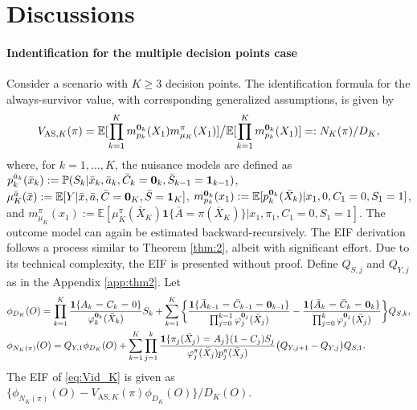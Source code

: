 \documentclass{article}
\newcommand{\pk}{{\varphi}}
\newcommand{\pr}{\mathbb{P}}
\newcommand{\E}{\mathbb{E}}
\newcommand{\tred}{{}}   %
\begin{document}
%
%
\section{Discussions}

\paragraph{Indentification for the multiple decision points case}
Consider a scenario with $K \ge 3$ decision points. The identification formula for the always-survivor value, with corresponding generalized assumptions, is given by
	\begin{gather}
	V_{\text{AS},K}(\pi) = 
	  {\E[ \prod_{k=1}^K m_{p_k}^{{\bf0}_k}(X_1) m_{\mu_K}^\pi(X_1) ]} \big /
	    {\E[ \prod_{k=1}^K m_{p_k}^{{\bf0}_k}(X_1) ]}
	    =: {N_K(\pi)}/{D_K},  \label{eq:Vid_K}
	\end{gather}
	where, for $k = 1, \dots, K$, the nuisance models are defined as
	$p_k^{\bar a_k}(\bar x_k) := \pr(S_k | \bar x_k, \bar a_k, \bar C_k={\bf0}_k, \bar S_{k-1}={\bf1}_{k-1})$,
	$\mu_K^{\bar a}(\bar x) := \E[Y | \bar x, \bar a, \bar C={\bf0}_K, \bar S={\bf1}_K]$,
	$m_{p_k}^{{\bf0}_k}(x_1) := \E[ p_k^{{\bf0}_k}(\bar X_k) | x_1, 0, C_1=0, S_1=1 ]$, and
	$m_{\mu_K}^{\pi}(x_1) := \E[ \mu_K^{\pi}(\bar X_K) \mathbf{1}\{\bar A=\pi(\bar X_K)\} %
	| x_1, \pi_1, C_1=0, S_1=1 ]$.
The outcome model can again be estimated backward-recursively.
The EIF derivation follows a process similar to Theorem \ref{thm:2}, albeit with significant effort. 
\tred{
Due to its technical complexity, the EIF is presented without proof. Define $Q_{S,j}$ and $Q_{Y,j}$ as in the Appendix \ref{app:thm2}. Let
\begin{align*}
	&\phi_{D_K}(O)
	 = \prod_{k=1}^K\frac{\mathbf{1}\{A_k\textrm{ = }C_k\textrm{ = }0\}}{\pk_k^{{\bf 0}_k}(\bar X_k)} S_k 
	 + \sum_{k=1}^K 
	   \bigg\{ \frac{\mathbf{1}\{\bar A_{k\emph{--}1}\textrm{ = }\bar C_{k\emph{--}1}\textrm{ = }{\bf0}_{k\emph{--}1}\}}{\prod_{j=0}^{k-1}\pk_j^{{\bf 0}_j}(\bar X_j)} - \frac{\mathbf{1}\{\bar A_{k}\textrm{ = }\bar C_{k}\textrm{ = }{\bf0}_{k}\}}{\prod_{j=0}^k\pk_j^{{\bf 0}_j}(\bar X_j)} \bigg\} Q_{S,k}, \\
%
	&\phi_{N_K(\pi)}(O) 
	 = Q_{Y,1} \phi_{D_K}(O) 
	 + \sum_{k=1}^K \prod_{j=1}^k \frac{\mathbf1\{\pi_j(\bar X_j)\textrm{ = }A_j\}(1-C_j)S_j}{\pk_j^{\pi}(\bar X_j)p_j^{\pi}(\bar X_j)} \big(Q_{Y,j+1} - Q_{Y,j}\big) Q_{S,1}.
\end{align*}
% 
The EIF of \eqref{eq:Vid_K} is given as $\{ \phi_{N_K(\pi)}(O) - V_{\text{AS},K}(\pi) \phi_{D_K}(O) \} / D_K(O)$.
}
\end{document}
